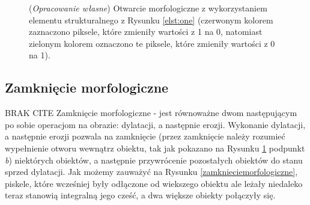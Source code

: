 \documentclass{article}
\begin{document}
        \begin{figure}[H]
            \centering
            \qquad
            \qquad
            \caption
            {
                (\textit{Opracowanie własne}) Otwarcie morfologiczne z wykorzystaniem elementu strukturalnego z Rysunku \ref{elst:one} (czerwonym kolorem zaznaczono piksele, które zmieniły wartości z 1 na 0, natomiast zielonym kolorem oznaczono te piksele, które zmieniły wartości z 0 na 1).
            }
            \label{otwarciemorfologiczne}
        \end{figure}

        \newpage
        \subsection{Zamknięcie morfologiczne}
        {
            BRAK CITE
            \label{sec:zamkniecie-morfologiczne}
            \Large
            \justifying
            \quad
            Zamknięcie morfologiczne - jest równoważne dwom następującym po sobie operacjom na obrazie: dylatacji, a następnie erozji.
            Wykonanie dylatacji, a następnie erozji pozwala na zamknięcie (przez zamknięcie należy rozumieć wypełnienie otworu wewnątrz obiektu, tak jak pokazano na Rysunku \ref{otwarciemorfologiczne} podpunkt \textit{b}) niektórych obiektów, a następnie przywrócenie pozostałych obiektów do stanu sprzed dylatacji.
            Jak możemy zauważyć na Rysunku \ref{zamknieciemorfologiczne}, piskele, które wcześniej były odłączone od wiekszego obiektu ale leżały niedaleko teraz stanowią integralną jego cześć, a dwa większe obiekty połączyły się.
        }
\end{document}
